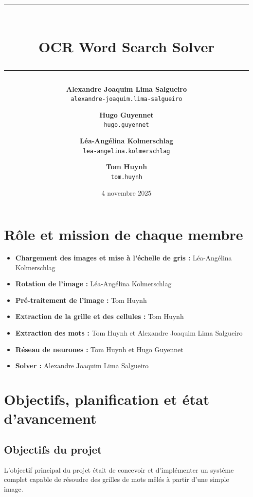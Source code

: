 \documentclass{article}
\title{
\rule{0.65\linewidth}{3pt}\\[0.7em]  %
OCR Word Search Solver\\[0.5em]
\rule{0.65\linewidth}{1pt}           %
}
\author{\small
  \textbf{Alexandre Joaquim Lima Salgueiro}\\
  \texttt{alexandre-joaquim.lima-salgueiro}
  \and
  \small
  \textbf{Hugo Guyennet}\\
  \texttt{hugo.guyennet}
  \and
  \small
  \textbf{Léa-Angélina Kolmerschlag}\\
  \texttt{lea-angelina.kolmerschlag}
  \and
  \small
  \textbf{Tom Huynh}\\
  \texttt{tom.huynh}
}
\date{4 novembre 2025}
\begin{document}
\maketitle
\tableofcontents



\section{Rôle et mission de chaque membre}

\begin{itemize}
    \item \textbf{Chargement des images et mise à l'échelle de gris :} Léa-Angélina Kolmerschlag
    \item \textbf{Rotation de l'image :} Léa-Angélina Kolmerschlag
    \item \textbf{Pré-traitement de l'image :} Tom Huynh
    \item \textbf{Extraction de la grille et des cellules :} Tom Huynh
    \item \textbf{Extraction des mots :} Tom Huynh et Alexandre Joaquim Lima Salgueiro
    \item \textbf{Réseau de neurones :} Tom Huynh et Hugo Guyennet
    \item \textbf{Solver :} Alexandre Joaquim Lima Salgueiro
\end{itemize}

\section{Objectifs, planification et état d'avancement}

\subsection{Objectifs du projet}
L'objectif principal du projet était de concevoir et d'implémenter un système complet capable de résoudre des grilles de mots mêlés à partir d'une simple image.
\end{document}
